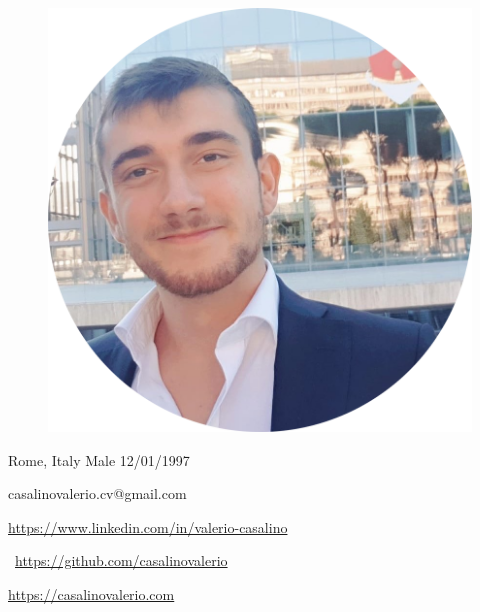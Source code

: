 \documentclass[10pt, openany, a4paper]{report}
\begin{document}
	
	\noindent\makebox[\linewidth]{\rule{\textwidth}{0.6pt}}
	
	\begin{minipage}{.3\textwidth}
		\begin{figure}[H]
			\centering
			\includegraphics[width=.9\textwidth]{idPicture}
		\end{figure}
	\end{minipage}
	\hfill
	\begin{minipage}{.65\textwidth}
	
			\vfill
			
			{\color{Sepia} \faMapMarker} Rome, Italy \hfill {\color{Sepia} \faMars} Male \hfill  {\color{Sepia} \faBirthdayCake } 12/01/1997
			
			\vfill
		
			{ \color{Salmon} \faEnvelope} casalinovalerio.cv@gmail.com
			
			\vfill

			{ \color{linkedinBlue} \faLinkedin} \url{https://www.linkedin.com/in/valerio-casalino}

			\vfill
			
			\faGithub \ \url{https://github.com/casalinovalerio}
			
			\vfill
			
			
			
			{ \color{Dandelion} \faChain } \url{https://casalinovalerio.com}
			
			\vfill
			
	\end{minipage}
\end{document}
